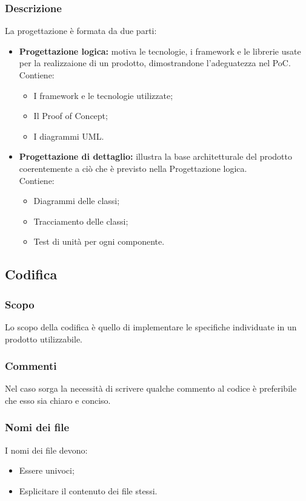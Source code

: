   \subsubsection{Descrizione}
  La progettazione è formata da due parti:
  \begin{itemize}
    \item \textbf{Progettazione logica:} motiva le tecnologie, i framework e le librerie usate per la realizzaione di un prodotto, dimostrandone l'adeguatezza nel PoC.
    \\Contiene:
    \begin{itemize}
      \item I framework e le tecnologie utilizzate;
      \item Il Proof of Concept;
      \item I diagrammi UML.
    \end{itemize}
    \item \textbf{Progettazione di dettaglio:} illustra la base architetturale del prodotto coerentemente a ciò che è previsto nella Progettazione logica.
    \\Contiene:
    \begin{itemize}
      \item Diagrammi delle classi;
      \item Tracciamento delle classi;
      \item Test di unità per ogni componente.
    \end{itemize}
  \end{itemize}

  \subsection{Codifica}
  \subsubsection{Scopo}
  Lo scopo della codifica è quello di implementare le specifiche individuate in un prodotto utilizzabile.
  \subsubsection{Commenti}
  Nel caso sorga la necessità di scrivere qualche commento al codice è preferibile che esso sia chiaro e conciso.
  \subsubsection{Nomi dei file}
  I nomi dei file devono:
  \begin{itemize}
    \item Essere univoci;
    \item Esplicitare il contenuto dei file stessi.
  \end{itemize}
